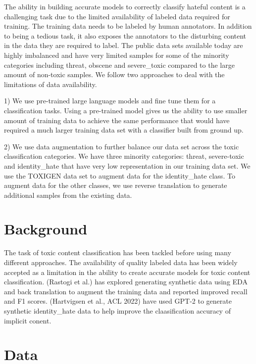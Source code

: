 \documentclass[11pt,a4paper]{article}
\begin{document}
The ability in building accurate models to correctly classify hateful content is a challenging task due to the limited availability of labeled data required for training. The training data needs to be labeled by human annotators. In addition to being a tedious task, it also exposes the annotators to the disturbing content in the data they are required to label. The public data sets available today are highly imbalanced and have very limited samples for some of the minority categories including threat, obscene and severe\_toxic compared to the large amount of non-toxic samples. We follow two approaches to deal with the limitations of data availability.

1) We use pre-trained large language models and fine tune them for a classification tasks. Using a pre-trained model gives us the ability to use smaller amount of training data to achieve the same performance that would have required a much larger training data set with a classifier built from ground up.

2) We use data augmentation to further balance our data set across the toxic classification categories. We have three minority categories: threat, severe-toxic and identity\_hate that have very low representation in our training data set. We use the TOXIGEN data set to augment data for the identity\_hate class. To augment data for the other classes, we use reverse translation to generate additional samples from the existing data. 



\section{Background}
The task of toxic content classification has been tackled before using many different approaches. The availability of quality labeled data has been widely accepted as a limitation in the ability to create accurate models for toxic content classification.
(Rastogi et al.) has explored generating synthetic data using EDA and back translation to augment the training data and reported improved recall and F1 scores. (Hartvigsen et al., ACL 2022) have used GPT-2 to generate synthetic identity\_hate data to help improve the claasification accuracy of implicit conent. 


\section{Data}
\end{document}
